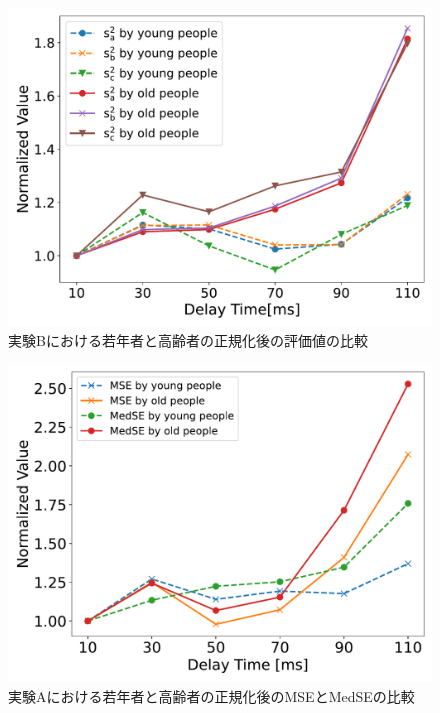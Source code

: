 \begin{figure}[tbp]
  \centering
  \includegraphics[scale=0.3]{figures/Honbann/Comparison_young_old/40_var_normalized.pdf}
  \caption{実験Bにおける若年者と高齢者の正規化後の評価値の比較}
  \label{fig:Normalized-Var_40ms_SaSbSc}
\end{figure}
\begin{figure}[tbp]
  \centering
  \includegraphics[scale=0.3]{figures/Honbann/Comparison_young_old/110_MSE-MedSE_normalized.pdf}
  \caption{実験Aにおける若年者と高齢者の正規化後のMSEとMedSEの比較}
  \label{fig:Normalized_110ms_MSE_MedSE}
\end{figure}
